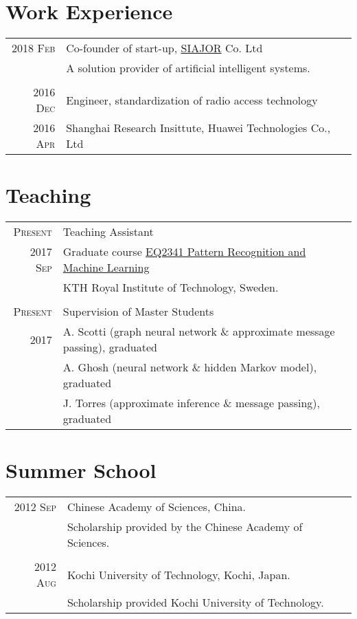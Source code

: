 \documentclass[a4paper,10pt]{article}
\begin{document}
\section{Work Experience}
\begin{tabular}{r|p{13cm}}
  \textsc{2018 Feb}  & Co-founder of start-up, \href{http://www.siajor.com/}{SIAJOR} Co. Ltd \\
                     & A solution provider of artificial intelligent systems. \\
  \multicolumn{2}{c}{} \\

  \textsc{2016 Dec}  & Engineer, standardization of radio access technology  \\
  \textsc{2016 Apr}  & Shanghai Research Insittute, Huawei Technologies Co., Ltd \\
\end{tabular}

\section{Teaching}
\begin{tabular}{r|p{13cm}}
  \textsc{Present}  & Teaching Assistant \\
  \textsc{2017 Sep}  & Graduate course \href{https://www.kth.se/student/kurser/kurs/EQ2341?l=en}{EQ2341 Pattern Recognition and Machine Learning} \\
                    & KTH Royal Institute of Technology, Sweden.\\
\multicolumn{2}{c}{} \\

  \textsc{Present}  & Supervision of Master Students \\
  \textsc{2017 }  & A. Scotti (graph neural network \& approximate message passing), graduated \\
                    & A. Ghosh (neural network \& hidden Markov model), graduated \\
                    & J. Torres (approximate inference \& message passing), graduated
\end{tabular}

\section{Summer School}
\begin{tabular}{r|p{13cm}}

  \textsc{2012 Sep}  & Chinese Academy of Sciences, China. \\
                     & Scholarship provided by the Chinese Academy of Sciences. \\
  \multicolumn{2}{c}{}\\
  \textsc{2012 Aug}  & Kochi University of Technology, Kochi, Japan. \\
                     & Scholarship provided Kochi University of Technology.
\end{tabular}
\end{document}
